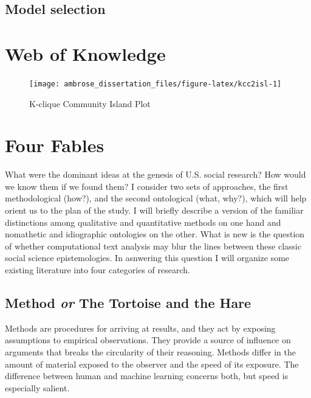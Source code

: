 \documentclass[]{book}
\begin{document}
\section{Model selection}\label{model-selection}

\chapter{Web of Knowledge}\label{web-of-knowledge}

\begin{figure}

{\centering \texttt{[image: ambrose\_dissertation\_files/figure-latex/kcc2isl-1]} 

}

\caption{K-clique Community Island Plot}\label{fig:kcc2isl}
\end{figure}

\chapter{Four Fables}\label{four-fables}

What were the dominant ideas at the genesis of U.S. social research? How
would we know them if we found them? I consider two sets of approaches,
the first methodological (how?), and the second ontological (what,
why?), which will help orient us to the plan of the study. I will
briefly describe a version of the familiar distinctions among
qualitative and quantitative methods on one hand and nomathetic and
idiographic ontologies on the other. What is new is the question of
whether computational text analysis may blur the lines between these
classic social science epistemologies. In asnwering this question I will
organize some existing literature into four categories of research.

\section{\texorpdfstring{Method \emph{or} The Tortoise and the
Hare}{Method or The Tortoise and the Hare}}\label{method-or-the-tortoise-and-the-hare}

Methods are procedures for arriving at results, and they act by exposing
assumptions to empirical observations. They provide a source of
influence on arguments that breaks the circularity of their reasoning.
Methods differ in the amount of material exposed to the observer and the
speed of its exposure. The difference between human and machine learning
concerns both, but speed is especially salient.
\end{document}
